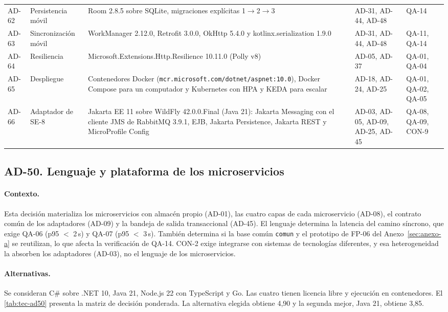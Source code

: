 \begin{longtable}{L{1.15cm} L{2.2cm} L{6.0cm} L{2.6cm} L{2.6cm}}
AD-62 & Persistencia móvil & Room 2.8.5 sobre SQLite, migraciones explícitas 1$\to$2$\to$3 & AD-31, AD-44, AD-48 & QA-14 \\
AD-63 & Sincronización móvil & WorkManager 2.12.0, Retrofit 3.0.0, OkHttp 5.4.0 y kotlinx.serialization 1.9.0 & AD-31, AD-44, AD-48 & QA-11, QA-14 \\
AD-64 & Resiliencia & Microsoft.Extensions.Http.Resilience 10.11.0 (Polly v8) & AD-05, AD-37 & QA-01, QA-04 \\
AD-65 & Despliegue & Contenedores Docker (\texttt{mcr.microsoft.com/\br{}dotnet/\br{}aspnet:10.0}), Docker Compose para un computador y Kubernetes con HPA y KEDA para escalar & AD-18, AD-24, AD-25 & QA-01, QA-02, QA-05 \\
AD-66 & Adaptador de SE-8 & Jakarta EE 11 sobre WildFly 42.0.0.Final (Java 21): Jakarta Messaging con el cliente JMS de RabbitMQ 3.9.1, EJB, Jakarta Persistence, Jakarta REST y MicroProfile Config & AD-03, AD-05, AD-09, AD-25, AD-45 & QA-08, QA-09, CON-9 \\
\end{longtable}
\endgroup

\subsection{AD-50. Lenguaje y plataforma de los microservicios}
\label{sec:tec-ad50}

\paragraph{Contexto.} Esta decisión materializa los microservicios con almacén propio (AD-01), las cuatro capas de cada microservicio (AD-08), el contrato común de los adaptadores (AD-09) y la bandeja de salida transaccional (AD-45).
El lenguaje determina la latencia del camino síncrono, que exige QA-06 (p95 $<$ 2\,s) y QA-07 (p95 $<$ 3\,s).
También determina si la base común \texttt{comun} y el prototipo de FP-06 del Anexo~\ref{sec:anexo-a} se reutilizan, lo que afecta la verificación de QA-14.
CON-2 exige integrarse con sistemas de tecnologías diferentes, y esa heterogeneidad la absorben los adaptadores (AD-03), no el lenguaje de los microservicios.

\paragraph{Alternativas.} Se consideran C\# sobre .NET 10, Java 21, Node.js 22 con TypeScript y Go.
Las cuatro tienen licencia libre y ejecución en contenedores.
El \cref{tab:tec-ad50} presenta la matriz de decisión ponderada.
La alternativa elegida obtiene 4,90 y la segunda mejor, Java 21, obtiene 3,85.

